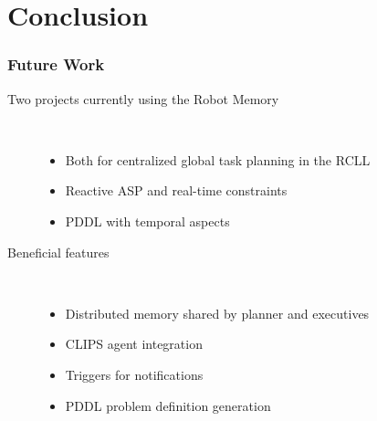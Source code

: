 \section{Conclusion}
\begin{frame}
  \frametitle{Future Work}
  \begin{description}
  \item[Two projects currently using the Robot Memory]\hfill\\
    \begin{itemize}
    \item Both for centralized global task planning in the RCLL
    \item Reactive ASP and real-time constraints
    \item PDDL with temporal aspects
    \end{itemize}
  \item[Beneficial features] \hfill \\
    \begin{itemize}
    \item Distributed memory shared by planner and executives
    \item CLIPS agent integration
    \item Triggers for notifications
    \item PDDL problem definition generation
    \end{itemize}
  \end{description}
\end{frame}

